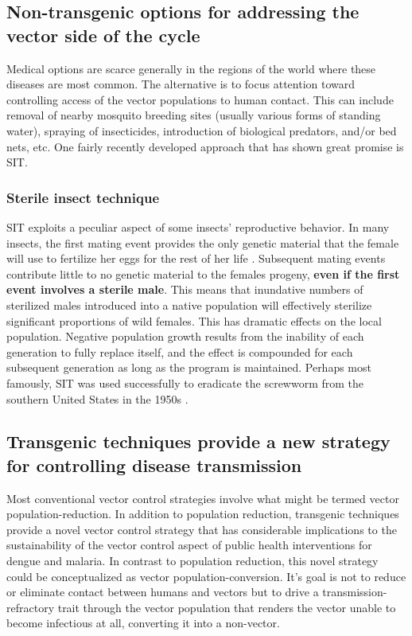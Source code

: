 \subsection[Addressing the vector side of the cycle (conventionally)]{Non-transgenic options for addressing the vector side of the cycle}

Medical options are scarce generally in the regions of the world where these diseases are most common.
The alternative is to focus attention toward controlling access of the vector populations to human contact.
This can include removal of nearby mosquito breeding sites (usually various forms of standing water), spraying of insecticides, introduction of biological predators, and/or bed nets, etc.
One fairly recently developed approach that has shown great promise is \gls{SIT}.



\subsubsection{Sterile insect technique}
\gls{SIT} exploits a peculiar aspect of some insects' reproductive behavior. 
In many insects, the first mating event provides the only genetic material that the female will use to fertilize her eggs for the rest of her life \CITEME.
Subsequent mating events contribute little to no genetic material to the females progeny, \textbf{even if the first event involves a sterile male}.
This means that inundative numbers of sterilized males introduced into a native population will effectively sterilize significant proportions of wild females.
This has dramatic effects on the local population.
Negative population growth results from the inability of each generation to fully replace itself, and the effect is compounded for each subsequent generation as long as the program is maintained.
Perhaps most famously, \gls{SIT} was used successfully to eradicate the screwworm from the southern United States in the 1950s \cite{Bushland1955}.


\subsection[Transgenesis provides new vector control strategy]{Transgenic techniques provide a new strategy for controlling disease transmission}

Most conventional vector control strategies involve what might be termed vector \gls{population-reduction}.
In addition to population reduction, transgenic techniques provide a novel vector control strategy that has considerable implications to the sustainability of the vector control aspect of public health interventions for dengue and malaria.
In contrast to population reduction, this novel strategy could be conceptualized as vector \gls{population-conversion}.
It's goal is not to reduce or eliminate contact between humans and vectors but to drive a transmission-refractory trait through the vector population that renders the vector unable to become infectious at all, converting it into a non-vector.

